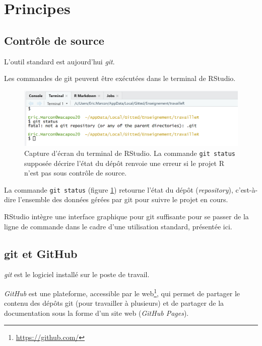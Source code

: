 \documentclass[
  12pt,
  french,
  a4paper,
  extrafontsizes,onecolumn,openright
  ]{memoir}
\newlength{\rf}
\begin{document}
\section{Principes}\label{sec:principes-git}

\subsection{Contrôle de source}\label{sec:git-cds}

L'outil standard est aujourd'hui \emph{git}.

Les commandes de git peuvent être exécutées dans le terminal de RStudio.



\scriptsize

\begin{figure}

{\centering \includegraphics[width=0.8\linewidth]{images/git-Status} 

}

\caption{Capture d'écran du terminal de RStudio. La commande \texttt{git\ status} supposée décrire l'état du dépôt renvoie une erreur si le projet R n'est pas sous contrôle de source.}\label{fig:git-Status}
\end{figure}

\normalsize

La commande \texttt{git\ status} (figure \ref{fig:git-Status}) retourne l'état du dépôt (\emph{repository}), c'est-à-dire l'ensemble des données gérées par git pour suivre le projet en cours.

RStudio intègre une interface graphique pour git suffisante pour se passer de la ligne de commande dans le cadre d'une utilisation standard, présentée ici.

\subsection{git et GitHub}\label{git-et-github-1}

\emph{git} est le logiciel installé sur le poste de travail.

\emph{GitHub} est une plateforme, accessible par le web\footnote{\url{https://github.com/}}, qui permet de partager le contenu des dépôts git (pour travailler à plusieurs) et de partager de la documentation sous la forme d'un site web (\emph{GitHub Pages}).
\end{document}
